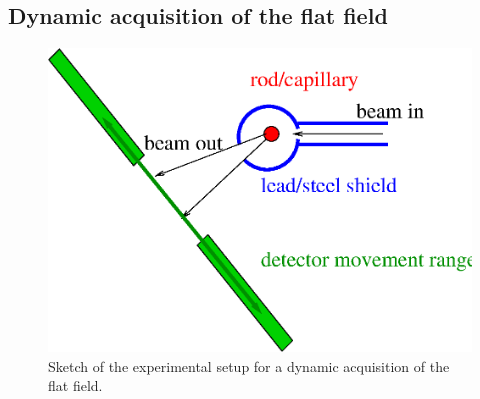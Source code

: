 \subsection{Dynamic acquisition of the flat field}

\begin{figure}
\begin{center}
\includegraphics[width=\textwidth]{images/FFSetup}
\end{center}
\caption{Sketch of the experimental setup for a dynamic acquisition of the flat field.}\label{fig:ffsetup}
\end{figure}

